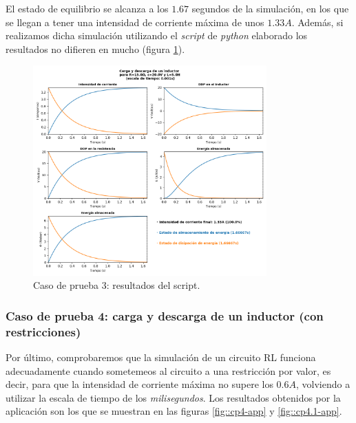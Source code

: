\documentclass[../main.tex]{subfiles}
\begin{document}
El estado de equilibrio se alcanza a los $1.67$ segundos de la simulación, en los que se llegan a tener una intensidad de corriente máxima de unos $1.33A$. Además, si realizamos dicha simulación utilizando el \textit{script} de \textit{python} elaborado los resultados no difieren en mucho (figura \ref{fig::cp3-py}).\\

\begin{figure}[!h]
    \centering
    \includegraphics[width=0.8\textwidth]{images/cp3-py.png}
    \caption{Caso de prueba 3: resultados del script. }
    \label{fig::cp3-py}
\end{figure}



\subsubsection{Caso de prueba 4: carga y descarga de un inductor (con restricciones)}

Por último, comprobaremos que la simulación de un circuito RL funciona adecuadamente cuando sometemeos al circuito a una restricción por valor, es decir, para que la intensidad de corriente máxima no supere los $0.6A$, volviendo a utilizar la escala de tiempo de los \textit{milisegundos}. Los resultados obtenidos por la aplicación son los que se muestran en las figuras \ref{fig::cp4-app} y \ref{fig::cp4.1-app}. \\
\end{document}
